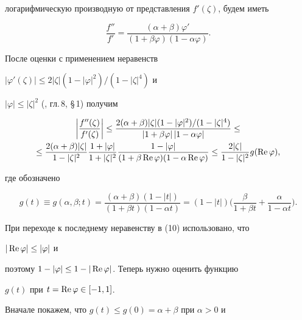 логарифмическую производную от представления $f'(\zeta)$, будем иметь


$$


\frac{f''}{f'}=\frac{(\alpha+\beta)\varphi'}


{(1+\beta\varphi)(1-\alpha\varphi)}.


$$


После оценки с применением неравенств


$|\varphi'(\zeta)|\le2|\zeta|(1-|\varphi|^2)/(1-|\zeta|^4)$ и


$|\varphi|\le|\zeta|^2$ (\cite{8}, гл.\,8, \S\,1) получим


\begin{multline}


\biggl|\frac{f''(\zeta)}{f'(\zeta)}\biggr|\le


\frac{2(\alpha+\beta)|\zeta|(1-|\varphi|^2)/(1-|\zeta|^4)}


{|1+\beta\varphi|\,|1-\alpha\varphi|} \le \\


%


\le \frac{2(\alpha+\beta)|\zeta|}{1-|\zeta|^2}


\frac{1+|\varphi|}{1+|\zeta|^2}


\frac{1-|\varphi|}{(1+\beta\re\varphi)(1-\alpha\re\varphi)}\le


\frac{2|\zeta|}{1-|\zeta|^2}g(\re \varphi),


\end{multline}


где обозначено


\begin{equation}


g(t)\equiv g(\alpha,\beta;t)=


\frac{(\alpha+\beta)(1-|t|)}{(1+\beta t)(1-\alpha t)}=


(1-|t|)\biggl(\frac{\beta}{1+\beta t}+\frac{\alpha}{1-\alpha t}\biggr).


\end{equation}


При переходе к последнему неравенству в (10) использовано, что


$|\operatorname{Re}\varphi|\le|\varphi|$ и


поэтому $1-|\varphi|\le 1-|\operatorname{Re}\varphi|$. Теперь нужно оценить функцию


$g(t)$ при $t=\operatorname{Re}\varphi\in[-1,1]$.





Вначале покажем, что $g(t)\le g(0)=\alpha+\beta$ при $\alpha>0$ и


